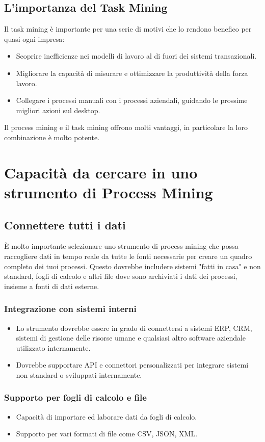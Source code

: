 \documentclass{article}
\begin{document}
\subsection{L'importanza del Task Mining}
Il task mining è importante per una serie di motivi che lo rendono benefico per quasi ogni impresa:
\begin{itemize}
    \item Scoprire inefficienze nei modelli di lavoro al di fuori dei sistemi transazionali.
    \item Migliorare la capacità di misurare e ottimizzare la produttività della forza lavoro.
    \item Collegare i processi manuali con i processi aziendali, guidando le prossime migliori azioni sul desktop.
\end{itemize}
Il process mining e il task mining offrono molti vantaggi, in particolare la loro combinazione è molto potente.

\section{Capacità da cercare in uno strumento di Process Mining}
\subsection{Connettere tutti i dati}
È molto importante selezionare uno strumento di process mining che possa raccogliere dati in tempo reale da tutte le fonti necessarie per creare un quadro completo dei tuoi processi. Questo dovrebbe includere sistemi "fatti in casa" e non standard, fogli di calcolo e altri file dove sono archiviati i dati dei processi, insieme a fonti di dati esterne.
\subsubsection{Integrazione con sistemi interni}
\begin{itemize}
    \item Lo strumento dovrebbe essere in grado di connettersi a sistemi ERP, CRM, sistemi di gestione delle risorse umane e qualsiasi altro software aziendale utilizzato internamente.
    \item Dovrebbe supportare API e connettori personalizzati per integrare sistemi non standard o sviluppati internamente.
\end{itemize}
\subsubsection{Supporto per fogli di calcolo e file}
\begin{itemize}
    \item Capacità di importare ed laborare dati da fogli di calcolo.
    \item Supporto per vari formati di file come CSV, JSON, XML.
\end{itemize}
\end{document}
